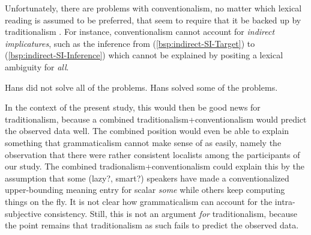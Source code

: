 \documentclass[fleqn,reqno,10pt,draft]{article}
\begin{document}
Unfortunately, there are problems with conventionalism, no matter
which lexical reading is assumed to be preferred, that seem to require
that it be backed up by traditionalism
\citep[e.g.][]{Sauerland2012:The-Computation}.
For instance, conventionalism cannot account for \emph{indirect
  implicatures}, such as the inference from
(\ref{bsp:indirect-SI-Target}) to (\ref{bsp:indirect-SI-Inference})
which cannot be explained by positing a lexical ambiguity for
\emph{all}.

\begin{exe}
  \ex \label{bsp:indirect-SI}
    \begin{xlist}
      \ex \label{bsp:indirect-SI-Target} Hans did not solve all of the problems.
      \ex \label{bsp:indirect-SI-Inference} Hans solved some of the problems.
    \end{xlist}
\end{exe}

\noindent In the context of the present study, this would then be good
news for traditionalism, because a combined
traditionalism+conventionalism would predict the observed data
well. The combined position would even be able to explain something
that grammaticalism cannot make sense of as easily, namely the
observation that there were rather consistent localists among the
participants of our study. The combined tradionalism+conventionalism
could explain this by the assumption that some (lazy?, smart?)
speakers have made a conventionalized upper-bounding meaning entry for
scalar \emph{some} while others keep computing things on the fly. It
is not clear how grammaticalism can account for the intra-subjective
consistency. Still, this is not an argument \emph{for} traditionalism,
because the point remains that traditionalism as such fails to predict
the observed data. 
  
\end{document}
